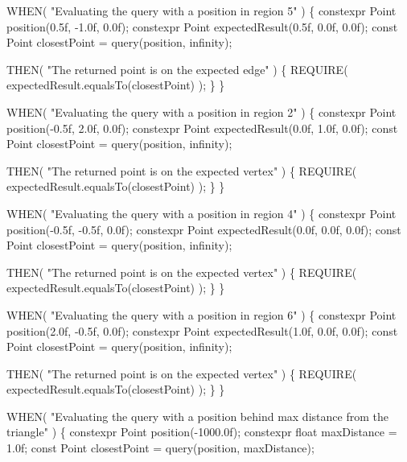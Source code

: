\begin{DoxyCodeInclude}
        WHEN( \textcolor{stringliteral}{"Evaluating the query with a position in region 5"} )
        \{
            constexpr Point position(0.5f, -1.0f, 0.0f);
            constexpr Point expectedResult(0.5f, 0.0f, 0.0f);
            \textcolor{keyword}{const} Point closestPoint = query(position, infinity);

            THEN( \textcolor{stringliteral}{"The returned point is on the expected edge"} )
            \{
                REQUIRE( expectedResult.equalsTo(closestPoint) );
            \}
        \}

        WHEN( \textcolor{stringliteral}{"Evaluating the query with a position in region 2"} )
        \{
            constexpr Point position(-0.5f, 2.0f, 0.0f);
            constexpr Point expectedResult(0.0f, 1.0f, 0.0f);
            \textcolor{keyword}{const} Point closestPoint = query(position, infinity);

            THEN( \textcolor{stringliteral}{"The returned point is on the expected vertex"} )
            \{
                REQUIRE( expectedResult.equalsTo(closestPoint) );
            \}
        \}

        WHEN( \textcolor{stringliteral}{"Evaluating the query with a position in region 4"} )
        \{
            constexpr Point position(-0.5f, -0.5f, 0.0f);
            constexpr Point expectedResult(0.0f, 0.0f, 0.0f);
            \textcolor{keyword}{const} Point closestPoint = query(position, infinity);

            THEN( \textcolor{stringliteral}{"The returned point is on the expected vertex"} )
            \{
                REQUIRE( expectedResult.equalsTo(closestPoint) );
            \}
        \}

        WHEN( \textcolor{stringliteral}{"Evaluating the query with a position in region 6"} )
        \{
            constexpr Point position(2.0f, -0.5f, 0.0f);
            constexpr Point expectedResult(1.0f, 0.0f, 0.0f);
            \textcolor{keyword}{const} Point closestPoint = query(position, infinity);

            THEN( \textcolor{stringliteral}{"The returned point is on the expected vertex"} )
            \{
                REQUIRE( expectedResult.equalsTo(closestPoint) );
            \}
        \}

        WHEN( \textcolor{stringliteral}{"Evaluating the query with a position behind max distance from the triangle"} )
        \{
            constexpr Point position(-1000.0f);
            constexpr \textcolor{keywordtype}{float} maxDistance = 1.0f;
            \textcolor{keyword}{const} Point closestPoint = query(position, maxDistance);


\end{DoxyCodeInclude}
